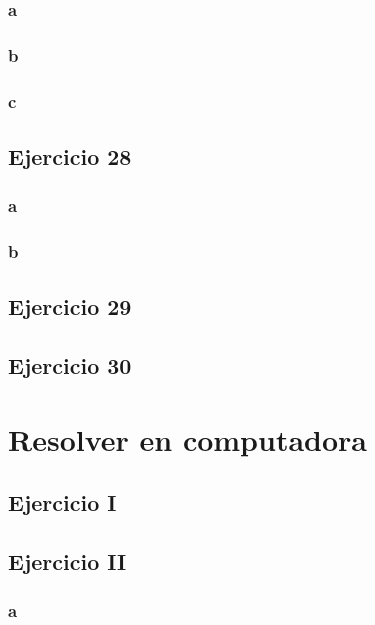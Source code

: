 \documentclass{article}
\begin{document}
\subsubsection*{a}

\subsubsection*{b}

\subsubsection*{c}

\subsection*{Ejercicio 28}

\subsubsection*{a}

\subsubsection*{b}

\subsection*{Ejercicio 29}

\subsection*{Ejercicio 30}

\section*{Resolver en computadora}

\subsection*{Ejercicio I}

\subsection*{Ejercicio II}

\subsubsection*{a}
\end{document}
